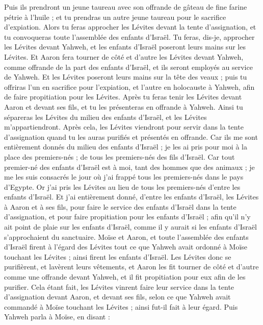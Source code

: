 \begin{multicols}{2}
Puis ils prendront un jeune taureau avec son offrande de gâteau de fine farine pétrie à l'huile ; et tu prendras un autre jeune taureau pour le sacrifice d'expiation.
Alors tu feras approcher les Lévites devant la tente d'assignation, et tu convoqueras toute l'assemblée des enfants d'Israël.
Tu feras, dis-je, approcher les Lévites devant Yahweh, et les enfants d'Israël poseront leurs mains sur les Lévites.
Et Aaron fera tourner de côté et d'autre les Lévites devant Yahweh, comme offrande de la part des enfants d'Israël, et ils seront employés au service de Yahweh.
Et les Lévites poseront leurs mains sur la tête des veaux ; puis tu offriras l'un en sacrifice pour l'expiation, et l'autre en holocauste à Yahweh, afin de faire propitiation pour les Lévites.
Après tu feras tenir les Lévites devant Aaron et devant ses fils, et tu les présenteras en offrande à Yahweh.
Ainsi tu sépareras les Lévites du milieu des enfants d'Israël, et les Lévites m'appartiendront.
Après cela, les Lévites viendront pour servir dans la tente d'assignation quand tu les auras purifiés et présentés en offrande.
Car ils me sont entièrement donnés du milieu des enfants d'Israël ; je les ai pris pour moi à la place des premiers-nés ; de tous les premiers-nés des fils d'Israël.
Car tout premier-né des enfants d'Israël est à moi, tant des hommes que des animaux ; je me les suis consacrés le jour où j'ai frappé tous les premiers-nés dans le pays d'Egypte.
Or j'ai pris les Lévites au lieu de tous les premiers-nés d'entre les enfants d'Israël.
Et j'ai entièrement donné, d'entre les enfants d'Israël, les Lévites à Aaron et à ses fils, pour faire le service des enfants d'Israël dans la tente d'assignation, et pour faire propitiation pour les enfants d'Israël ; afin qu'il n'y ait point de plaie sur les enfants d'Israël, comme il y aurait si les enfants d'Israël s'approchaient du sanctuaire.
Moïse et Aaron, et toute l'assemblée des enfants d'Israël firent à l'égard des Lévites tout ce que Yahweh avait ordonné à Moïse touchant les Lévites ; ainsi firent les enfants d'Israël.
Les Lévites donc se purifièrent, et lavèrent leurs vêtements, et Aaron les fit tourner de côté et d'autre comme une offrande devant Yahweh, et il fit propitiation pour eux afin de les purifier.
Cela étant fait, les Lévites vinrent faire leur service dans la tente d'assignation devant Aaron, et devant ses fils, selon ce que Yahweh avait commandé à Moïse touchant les Lévites ; ainsi fut-il fait à leur égard.
Puis Yahweh parla à Moïse, en disant :

\end{multicols}
